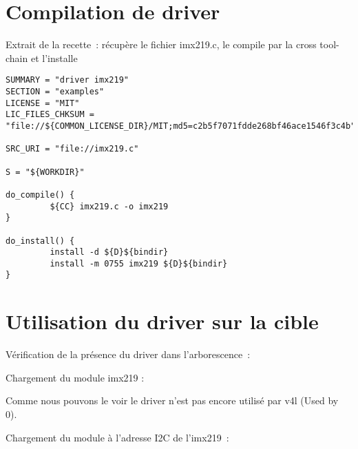 \section{Compilation de driver}
Extrait de la recette : récupère le fichier imx219.c, le compile par la cross
tool-chain et l’installe

\begin{lstlisting}
SUMMARY = "driver imx219"
SECTION = "examples"
LICENSE = "MIT"
LIC_FILES_CHKSUM = "file://${COMMON_LICENSE_DIR}/MIT;md5=c2b5f7071fdde268bf46ace1546f3c4b"

SRC_URI = "file://imx219.c"

S = "${WORKDIR}"

do_compile() {
         ${CC} imx219.c -o imx219
}

do_install() {
         install -d ${D}${bindir}
         install -m 0755 imx219 ${D}${bindir}
}
\end{lstlisting}

\section{Utilisation du driver sur la cible}
Vérification de la présence du driver dans l’arborescence :


Chargement du module imx219 :


Comme nous pouvons le voir le driver n’est pas encore utilisé par v4l (Used by 0).

\clearpage

Chargement du module à l’adresse I2C de l’imx219 :


